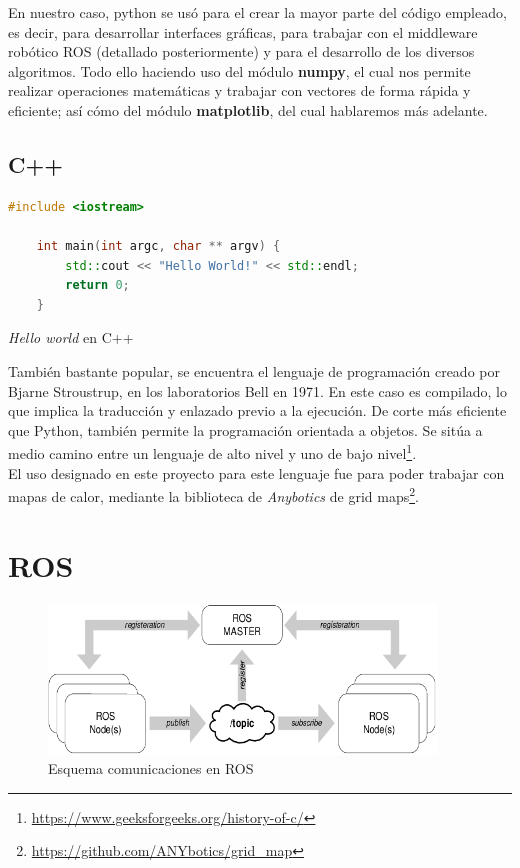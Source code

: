 En nuestro caso, python se usó para el crear la mayor parte del código empleado, es decir, para desarrollar interfaces gráficas, para trabajar con el middleware robótico \ac{ROS} (detallado posteriormente) y para el desarrollo de los diversos algoritmos. Todo ello haciendo uso del módulo \textbf{numpy}, el cual nos permite realizar operaciones matemáticas y trabajar con vectores de forma rápida y eficiente; así cómo del módulo \textbf{matplotlib}, del cual hablaremos más adelante.\\

\subsection{C++}
\label{subsec:cplusplus}

\begin{code}[hp]
	\begin{lstlisting}[language=C++]
	#include <iostream>
	
	int main(int argc, char ** argv) {
		std::cout << "Hello World!" << std::endl;
		return 0;
	}
	\end{lstlisting}
	\caption[Hello world en C++]{\emph{Hello world} en C++}
	\label{cod:helloworld_cplusplus}
\end{code}

También bastante popular, se encuentra el lenguaje de programación creado por Bjarne Stroustrup, en los laboratorios Bell en 1971. En este caso es compilado, lo que implica la traducción y enlazado previo a la ejecución. De corte más eficiente que Python, también permite la programación orientada a objetos. Se sitúa a medio camino entre un lenguaje de alto nivel y uno de bajo nivel\footnote[4]{\url{https://www.geeksforgeeks.org/history-of-c/}}.\\

El uso designado en este proyecto para este lenguaje fue para poder trabajar con mapas de calor, mediante la biblioteca de \emph{Anybotics} de grid maps\footnote[5]{\url{https://github.com/ANYbotics/grid_map}}.

\section{\ac{ROS}}
\label{sec:ros}

\begin{figure} [tp]
	\begin{center}
	\includegraphics[height=4cm]{imagenes/cap3/1_ros_esquema.png}
	\end{center}
	\caption[Esquema de comunicaciones en ROS]{Esquema comunicaciones en ROS}
	\label{fig:ros}
\end{figure}

